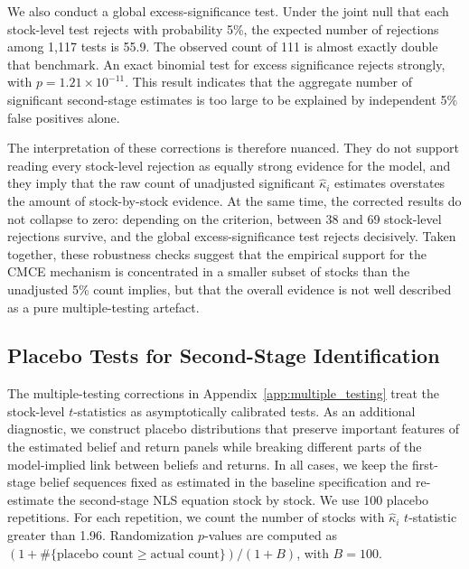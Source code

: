 We also conduct a global excess-significance test.
Under the joint null that each stock-level test rejects with probability 5\%, the expected number of rejections among 1{,}117 tests is 55.9.
The observed count of 111 is almost exactly double that benchmark.
An exact binomial test for excess significance rejects strongly, with $p = 1.21 \times 10^{-11}$.
This result indicates that the aggregate number of significant second-stage estimates is too large to be explained by independent 5\% false positives alone.

The interpretation of these corrections is therefore nuanced.
They do not support reading every stock-level rejection as equally strong evidence for the model, and they imply that the raw count of unadjusted significant $\hat{\kappa}_i$ estimates overstates the amount of stock-by-stock evidence.
At the same time, the corrected results do not collapse to zero: depending on the criterion, between 38 and 69 stock-level rejections survive, and the global excess-significance test rejects decisively.
Taken together, these robustness checks suggest that the empirical support for the CMCE mechanism is concentrated in a smaller subset of stocks than the unadjusted 5\% count implies, but that the overall evidence is not well described as a pure multiple-testing artefact.

\subsection{Placebo Tests for Second-Stage Identification}\label{app:placebo_stage2}

The multiple-testing corrections in Appendix~\ref{app:multiple_testing} treat the stock-level $t$-statistics as asymptotically calibrated tests.
As an additional diagnostic, we construct placebo distributions that preserve important features of the estimated belief and return panels while breaking different parts of the model-implied link between beliefs and returns.
In all cases, we keep the first-stage belief sequences fixed as estimated in the baseline specification and re-estimate the second-stage NLS equation stock by stock.
We use 100 placebo repetitions.
For each repetition, we count the number of stocks with $\hat\kappa_i$ $t$-statistic greater than 1.96.
Randomization $p$-values are computed as $(1+\#\{\text{placebo count}\geq \text{actual count}\})/(1+B)$, with $B=100$.

